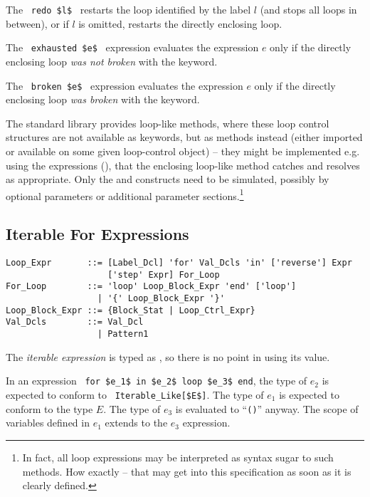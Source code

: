 The ~\lstinline!redo $l$!~ restarts the loop identified by the label $l$ (and stops all loops in between), or if $l$ is omitted, restarts the directly enclosing loop. 

The ~\lstinline!exhausted $e$!~ expression evaluates the expression $e$ only if the directly enclosing loop {\em was not broken} with the  keyword. 

The ~\lstinline!broken $e$!~ expression evaluates the expression $e$ only if the directly enclosing loop {\em was broken} with the  keyword. 

The standard library provides loop-like methods, where these loop control structures are not available as keywords, but as methods instead (either imported or available on some given loop-control object) -- they might be implemented e.g. using the  expressions (), that the enclosing loop-like method catches and resolves as appropriate. Only the  and  constructs need to be simulated, possibly by optional parameters or additional parameter sections.\footnote{In fact, all loop expressions may be interpreted as syntax sugar to such methods. How exactly -- that may get into this specification as soon as it is clearly defined.} 





\subsection{Iterable For Expressions}
\label{sec:iterable-expressions}

\syntax\begin{lstlisting}
Loop_Expr       ::= [Label_Dcl] 'for' Val_Dcls 'in' ['reverse'] Expr 
                    ['step' Expr] For_Loop
For_Loop        ::= 'loop' Loop_Block_Expr 'end' ['loop']
                  | '{' Loop_Block_Expr '}'
Loop_Block_Expr ::= {Block_Stat | Loop_Ctrl_Expr}
Val_Dcls        ::= Val_Dcl
                  | Pattern1
\end{lstlisting}

The {\em iterable expression} is typed as , so there is no point in using its value. 

In an expression ~\lstinline!for $e_1$ in $e_2$ loop $e_3$ end!, the type of $e_2$ is expected to conform to ~\lstinline!Iterable_Like[$E$]!. The type of $e_1$ is expected to conform to the type $E$. The type of $e_3$ is evaluated to ``\lstinline!()!'' anyway. The scope of variables defined in $e_1$ extends to the $e_3$ expression. 

